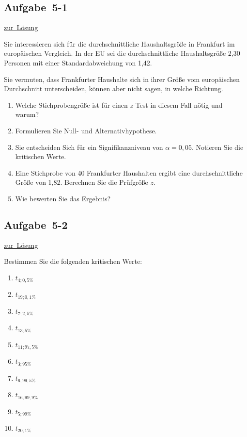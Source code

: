 \documentclass[
  11pt,
  ngerman,
  a4paper,
]{report}
\providecommand{\tightlist}{%
  \setlength{\itemsep}{0pt}\setlength{\parskip}{0pt}}
\begin{document}
\nopagebreak

\hypertarget{aufgabe-5-1}{%
\subsection{Aufgabe~5-1}\label{aufgabe-5-1}}

\protect\hyperlink{loesung-5-1}{zur~Lösung}

Sie interessieren sich für die durchschnittliche Haushaltsgröße in Frankfurt im europäischen Vergleich. In der EU sei die durchschnittliche Haushaltsgröße 2,30 Personen mit einer Standardabweichung von 1,42.

Sie vermuten, dass Frankfurter Haushalte sich in ihrer Größe vom europäischen Durchschnitt unterscheiden, können aber nicht sagen, in welche Richtung.

\begin{enumerate}
\def\labelenumi{\alph{enumi})}
\tightlist
\item
  Welche Stichprobengröße ist für einen \(z\)-Test in diesem Fall nötig und warum?
\item
  Formulieren Sie Null- und Alternativhypothese.
\item
  Sie entscheiden Sich für ein Signifikanzniveau von \(\alpha=0{,}05\). Notieren Sie die kritischen Werte.
\item
  Eine Stichprobe von 40 Frankfurter Haushalten ergibt eine durchschnittliche Größe von 1,82. Berechnen Sie die Prüfgröße \(z\).
\item
  Wie bewerten Sie das Ergebnis?
\end{enumerate}

\hypertarget{aufgabe-5-2}{%
\subsection{Aufgabe~5-2}\label{aufgabe-5-2}}

\protect\hyperlink{loesung-5-2}{zur~Lösung}

Bestimmen Sie die folgenden kritischen Werte:

\begin{enumerate}
\def\labelenumi{\alph{enumi})}
\tightlist
\item
  \(t_{4;0{,}5\%}\)
\item
  \(t_{19;0{,}1\%}\)
\item
  \(t_{7;2{,}5\%}\)
\item
  \(t_{13;5\%}\)
\item
  \(t_{11;97{,}5\%}\)
\item
  \(t_{3;95\%}\)
\item
  \(t_{6;99{,}5\%}\)
\item
  \(t_{16;99{,}9\%}\)
\item
  \(t_{5;99\%}\)
\item
  \(t_{20;1\%}\)
\end{enumerate}
\end{document}

